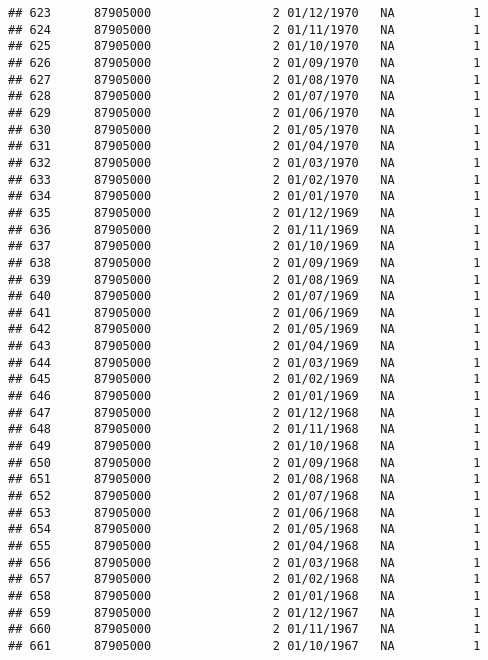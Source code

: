 \documentclass[
]{article}
\begin{document}
\begin{verbatim}
## 623      87905000                 2 01/12/1970   NA           1
## 624      87905000                 2 01/11/1970   NA           1
## 625      87905000                 2 01/10/1970   NA           1
## 626      87905000                 2 01/09/1970   NA           1
## 627      87905000                 2 01/08/1970   NA           1
## 628      87905000                 2 01/07/1970   NA           1
## 629      87905000                 2 01/06/1970   NA           1
## 630      87905000                 2 01/05/1970   NA           1
## 631      87905000                 2 01/04/1970   NA           1
## 632      87905000                 2 01/03/1970   NA           1
## 633      87905000                 2 01/02/1970   NA           1
## 634      87905000                 2 01/01/1970   NA           1
## 635      87905000                 2 01/12/1969   NA           1
## 636      87905000                 2 01/11/1969   NA           1
## 637      87905000                 2 01/10/1969   NA           1
## 638      87905000                 2 01/09/1969   NA           1
## 639      87905000                 2 01/08/1969   NA           1
## 640      87905000                 2 01/07/1969   NA           1
## 641      87905000                 2 01/06/1969   NA           1
## 642      87905000                 2 01/05/1969   NA           1
## 643      87905000                 2 01/04/1969   NA           1
## 644      87905000                 2 01/03/1969   NA           1
## 645      87905000                 2 01/02/1969   NA           1
## 646      87905000                 2 01/01/1969   NA           1
## 647      87905000                 2 01/12/1968   NA           1
## 648      87905000                 2 01/11/1968   NA           1
## 649      87905000                 2 01/10/1968   NA           1
## 650      87905000                 2 01/09/1968   NA           1
## 651      87905000                 2 01/08/1968   NA           1
## 652      87905000                 2 01/07/1968   NA           1
## 653      87905000                 2 01/06/1968   NA           1
## 654      87905000                 2 01/05/1968   NA           1
## 655      87905000                 2 01/04/1968   NA           1
## 656      87905000                 2 01/03/1968   NA           1
## 657      87905000                 2 01/02/1968   NA           1
## 658      87905000                 2 01/01/1968   NA           1
## 659      87905000                 2 01/12/1967   NA           1
## 660      87905000                 2 01/11/1967   NA           1
## 661      87905000                 2 01/10/1967   NA           1

\end{verbatim}
\end{document}
